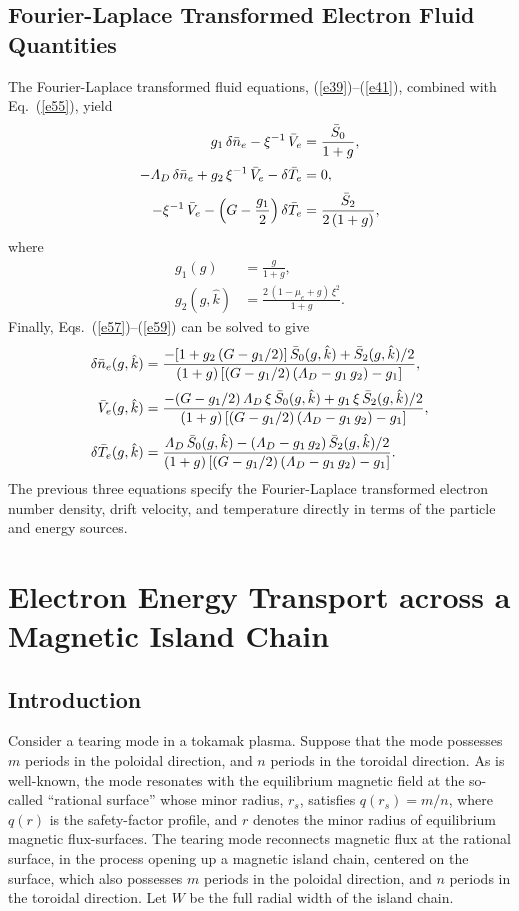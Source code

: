 \documentclass[12pt,prb,aps]{revtex4-1}
\begin{document}
\subsection{Fourier-Laplace Transformed Electron Fluid Quantities}
The Fourier-Laplace transformed fluid equations, (\ref{e39})--(\ref{e41}), combined with Eq.~(\ref{e55}), yield
\begin{align}\label{e57}
g_1\,\delta\bar{n}_e-\xi^{-1}\,\bar{V}_e&= \frac{\bar{S}_0}{1+g},\\[0.5ex]
-{\mit\Lambda}_D\,\delta\bar{n}_e+g_2\,\xi^{-1}\,\bar{V}_e-\delta\bar{T}_e&=0,\\[0.5ex]
-\xi^{-1}\,\bar{V}_e-\left(G-\frac{g_1}{2}\right)\delta\bar{T}_e&= \frac{\bar{S}_2}{2\,(1+g)},\label{e59}
\end{align}
where
\begin{align}
g_1(g)&= \frac{g}{1+g},\\[0.5ex]
g_2(g,\hat{k})&=\frac{2\,(1-\mu_e+g)\,\xi^2}{1+g}.
\end{align}
Finally, Eqs.~(\ref{e57})--(\ref{e59})  can be solved to give\,\cite{haz}
\begin{align}\label{e67}
\delta\bar{n}_e(g,\hat{k})&=  \frac{-[1+g_2\,(G-g_1/2)]\,\bar{S}_0(g,\hat{k})+\bar{S}_2(g,\hat{k})/2}{(1+g)\,[(G-g_1/2)\,({\mit\Lambda}_D-g_1\,g_2)-g_1]},\\[0.5ex]
\bar{V}_e(g,\hat{k}) &=\frac{-(G-g_1/2)\,{\mit\Lambda}_D\,\xi\,\bar{S}_0(g,\hat{k})+g_1\,\xi\,\bar{S}_2(g,\hat{k})/2}{(1+g)\,[(G-g_1/2)\,({\mit\Lambda}_D-g_1\,g_2)-g_1]},\\[0.5ex]
\delta\bar{T}_e(g,\hat{k})&= \frac{{\mit\Lambda}_D\,\bar{S}_0(g,\hat{k})-({\mit\Lambda}_D-g_1\,g_2)\,\bar{S}_2(g,\hat{k})/2}{(1+g)\,[(G-g_1/2)\,({\mit\Lambda}_D-g_1\,g_2)-g_1]}.\label{e69}
\end{align}
The previous three equations specify the Fourier-Laplace transformed electron number density, drift velocity, and temperature
directly in terms of the particle and energy sources. 

\section{Electron Energy Transport across a Magnetic Island Chain}

\subsection{Introduction}
Consider a tearing mode  in a tokamak plasma.\cite{fkr} Suppose that the mode possesses $m$ periods in the poloidal direction, and $n$ periods in the toroidal direction. As is well-known, the
mode resonates with the equilibrium magnetic field at the so-called ``rational surface'' whose minor radius, $r_s$, satisfies $q(r_s)=m/n$, where $q(r)$ is the
safety-factor profile, and $r$ denotes the minor radius of equilibrium magnetic flux-surfaces.\cite{wesson} The tearing mode reconnects magnetic flux at the rational surface, in the process opening up a magnetic island chain, centered on the surface,  which also possesses $m$ periods in the poloidal direction, and $n$ periods in the toroidal direction.\cite{ruth}  Let $W$ be the full radial width of the island chain. 
\end{document}

